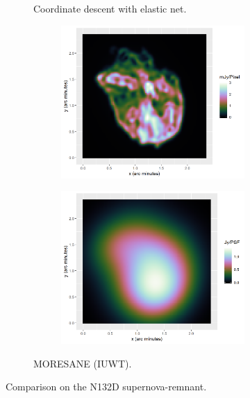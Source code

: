 \begin{figure}[!ht]
\begin{subfigure}[b]{1.0\linewidth}
		\caption{Coordinate descent with elastic net.}
	\end{subfigure}
	\begin{subfigure}[b]{1.0\linewidth}
		\centering
		\begin{subfigure}{0.40\linewidth}
			\includegraphics[width=1.00\linewidth]{./chapters/10.results/iuwt/iuwt-N132.png}
		\end{subfigure}
		\begin{subfigure}{0.40\linewidth}
			\includegraphics[width=1.00\linewidth]{./chapters/10.results/iuwt/iuwt-image-N132.png}
		\end{subfigure}
		\caption{MORESANE (IUWT).}
	\end{subfigure}

	\caption{Comparison on the N132D supernova-remnant.}
	\label{results:cleancomp::N132:figure}
\end{figure}


